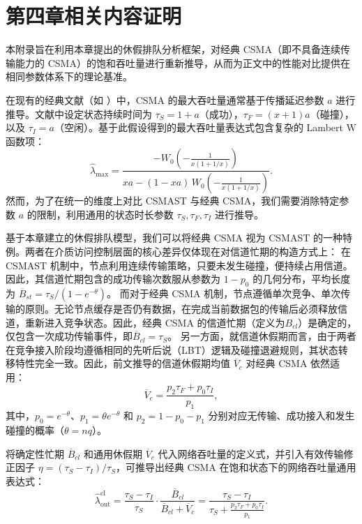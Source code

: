 
\chapter{第四章相关内容证明}
\label{app:classic_csma}


本附录旨在利用本章提出的休假排队分析框架，对经典 CSMA（即不具备连续传输能力的 CSMA）的饱和吞吐量进行重新推导，从而为正文中的性能对比提供在相同参数体系下的理论基准。

在现有的经典文献（如 \cite{Lin2013Toward}）中，CSMA 的最大吞吐量通常基于传播延迟参数 $a$ 进行推导。文献中设定状态持续时间为 $\tau_{S}=1+a$（成功），$\tau_{F}=(x+1)a$（碰撞），以及 $\tau_{I}=a$（空闲）。基于此假设得到的最大吞吐量表达式包含复杂的 Lambert W 函数项：
\begin{equation}
	\hat{\lambda}_{\text{max}} = \frac{-W_{0}\left(-\frac{1}{x(1+1/x)}\right)}{xa-(1-xa)\,W_{0}\left(-\frac{1}{x(1+1/x)}\right)}.
\end{equation}
然而，为了在统一的维度上对比 CSMAST 与经典 CSMA，我们需要消除特定参数 $a$ 的限制，利用通用的状态时长参数 $\tau_S, \tau_F, \tau_I$ 进行推导。

基于本章建立的休假排队模型，我们可以将经典 CSMA 视为 CSMAST 的一种特例。两者在介质访问控制层面的核心差异仅体现在对信道忙期的构造方式上：
在CSMAST 机制中，节点利用连续传输策略，只要未发生碰撞，便持续占用信道。因此，其信道忙期包含的成功传输次数服从参数为 $1-p_0$ 的几何分布，平均长度为 $\overline{B}_{st} = \tau_S / (1-e^{-\theta})$。
而对于经典 CSMA 机制，节点遵循单次竞争、单次传输的原则。无论节点缓存是否仍有数据，在完成当前数据包的传输后必须释放信道，重新进入竞争状态。因此，经典 CSMA 的信道忙期（定义为$ B_{cl} $）是确定的，仅包含一次成功传输事件，即$ \overline{B}_{cl} = \tau_S $。
另一方面，就信道休假期而言，由于两者在竞争接入阶段均遵循相同的先听后说（LBT）逻辑及碰撞退避规则，其状态转移特性完全一致。因此，前文推导的信道休假期均值 $\overline{V}_c$ 对经典 CSMA 依然适用：
\begin{equation}
	\overline{V}_c = \frac{p_{2}\tau_{F}+p_{0}\tau_{I}}{p_{1}},
\end{equation}
其中，$p_0 = e^{-\theta}$、$p_1 = \theta e^{-\theta}$ 和 $p_2 = 1 - p_0 - p_1$ 分别对应无传输、成功接入和发生碰撞的概率（$\theta = nq$）。

将确定性忙期 $\overline{B}_{cl}$ 和通用休假期 $\overline{V}_c$ 代入网络吞吐量的定义式，并引入有效传输修正因子 $\eta = (\tau_S - \tau_I)/\tau_S$，可推导出经典 CSMA 在饱和状态下的网络吞吐量通用表达式：
\begin{equation}
	\label{eq:classic_csma_throughput}
	\hat{\lambda}_{\text{out}}^{\text{cl}} = \frac{\tau_{S}-\tau_{I}}{\tau_{S}} \cdot \frac{\overline{B}_{cl}}{\overline{B}_{cl}+\overline{V}_{c}} = \frac{\tau_{S}-\tau_{I}}{\tau_{S}+\frac{p_{2}\tau_{F}+p_{0}\tau_{I}}{p_{1}}}.
\end{equation}

